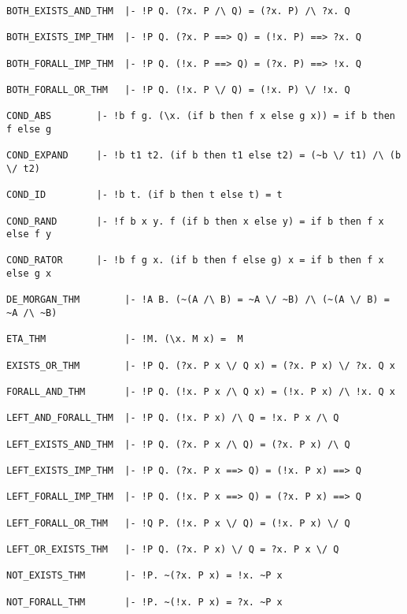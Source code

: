 \begin{boxed}\begin{verbatim}
BOTH_EXISTS_AND_THM  |- !P Q. (?x. P /\ Q) = (?x. P) /\ ?x. Q

BOTH_EXISTS_IMP_THM  |- !P Q. (?x. P ==> Q) = (!x. P) ==> ?x. Q

BOTH_FORALL_IMP_THM  |- !P Q. (!x. P ==> Q) = (?x. P) ==> !x. Q

BOTH_FORALL_OR_THM   |- !P Q. (!x. P \/ Q) = (!x. P) \/ !x. Q

COND_ABS        |- !b f g. (\x. (if b then f x else g x)) = if b then f else g

COND_EXPAND     |- !b t1 t2. (if b then t1 else t2) = (~b \/ t1) /\ (b \/ t2)

COND_ID         |- !b t. (if b then t else t) = t

COND_RAND       |- !f b x y. f (if b then x else y) = if b then f x else f y

COND_RATOR      |- !b f g x. (if b then f else g) x = if b then f x else g x

DE_MORGAN_THM        |- !A B. (~(A /\ B) = ~A \/ ~B) /\ (~(A \/ B) = ~A /\ ~B)

ETA_THM              |- !M. (\x. M x) =  M

EXISTS_OR_THM        |- !P Q. (?x. P x \/ Q x) = (?x. P x) \/ ?x. Q x

FORALL_AND_THM       |- !P Q. (!x. P x /\ Q x) = (!x. P x) /\ !x. Q x

LEFT_AND_FORALL_THM  |- !P Q. (!x. P x) /\ Q = !x. P x /\ Q

LEFT_EXISTS_AND_THM  |- !P Q. (?x. P x /\ Q) = (?x. P x) /\ Q

LEFT_EXISTS_IMP_THM  |- !P Q. (?x. P x ==> Q) = (!x. P x) ==> Q

LEFT_FORALL_IMP_THM  |- !P Q. (!x. P x ==> Q) = (?x. P x) ==> Q

LEFT_FORALL_OR_THM   |- !Q P. (!x. P x \/ Q) = (!x. P x) \/ Q

LEFT_OR_EXISTS_THM   |- !P Q. (?x. P x) \/ Q = ?x. P x \/ Q

NOT_EXISTS_THM       |- !P. ~(?x. P x) = !x. ~P x

NOT_FORALL_THM       |- !P. ~(!x. P x) = ?x. ~P x
\end{verbatim}\end{boxed}

